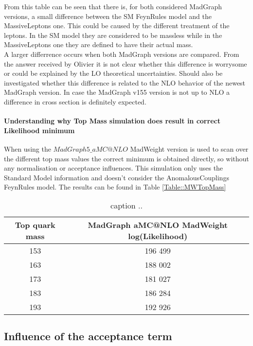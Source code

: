 From this table can be seen that there is, for both considered MadGraph versions, a small difference between the SM FeynRules model and the MassiveLeptons one. This could be caused by the different treatment of the leptons. In the SM model they are considered to be massless while in the MassiveLeptons one they are defined to have their actual mass.\\
A larger differrence occurs when both MadGraph versions are compared. From the answer received by Olivier it is not clear whether this difference is worrysome or could be explained by the LO theoretical uncertainties. Should also be investigated whether this difference is related to the NLO behavior of the newest MadGraph version. In case the MadGraph v155 version is not up to NLO a difference in cross section is definitely expected.

\paragraph{Understanding why Top Mass simulation does result in correct Likelihood minimum\\}
When using the $MadGraph5\_aMC@NLO$ MadWeight version is used to scan over the different top mass values the correct minimum is obtained directly, so without any normalisation or acceptance influences. This simulation only uses the Standard Model information and doesn't consider the AnomalousCouplings FeynRules model.
The results can be found in Table \ref{Table::MWTopMass}

\begin{table}[h!]
 \centering
 \begin{tabular}{|c|c|}
  \hline
  Top quark mass	&  MadGraph aMC@NLO MadWeight log(Likelihood)\\
  \hline
    153 		& 196 499	\\
    163			& 188 002	\\
    173			& 181 027	\\
    183			& 186 284	\\
    193			& 192 926	\\
  \hline 
 \end{tabular} 
 \caption{ caption ..} \label{table::MGXS}
\end{table}

\subsection{Influence of the acceptance term}

